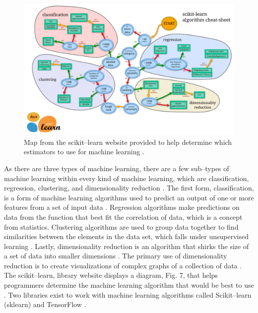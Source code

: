 \documentclass[a4paper, 12pt]{article}
\begin{document}
\begin{figure}[!h]
\centering
\includegraphics[scale=0.1]{ml_map}
\caption{Map from the scikit--learn website provided to help determine which estimators to use for machine learning \cite{SciKit}.}
\end{figure}

\begin{paragraph}
\indent As there are three types of machine learning, there are a few sub--types of machine learning within every kind of machine learning, which are classification, regression, clustering, and dimensionality reduction \cite{pythonML}. The first form, classification, is a form of machine learning algorithms used to predict an output of one or more features from a set of input data \cite{pythonML}. Regression algorithms make predictions on data from the function that best fit the correlation of data, which is a concept from statistics. Clustering algorithms are used to group data together to find similarities between the elements in the data set, which falls under unsupervised learning \cite{pythonML}. Lastly, dimensionality reduction is an algorithm that shirks the size of a set of data into smaller dimensions \cite{pythonML}. The primary use of dimensionality reduction is to create visualizations of complex graphs of a collection of data \cite{pythonML}. The scikit--learn, library website displays a diagram, Fig. 7, that helps programmers determine the machine learning algorithm that would be best to use \cite{SciKit}. Two libraries exist to work with machine learning algorithms called Scikit--learn (sklearn) and TensorFlow \cite{pythonML}.
\end{paragraph}
\end{document}

